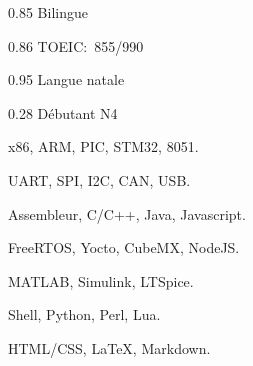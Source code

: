 \documentclass{faresume}
\begin{document}
\begin{column}[\rightcolumnwidth]




        {}{}{}{}

        {}{}{}{}

        {}{}{}{}

        {}{}{}{}


            {0.85}
            {Bilingue}
            {}{}{}

            {0.86}
            {TOEIC:~855/990}
            {}{}{}

            {0.95}
            {Langue natale}
            {}{}{}

            {0.28}
            {Débutant N4}
            {}{}{}


            {x86, ARM, PIC, STM32, 8051.}
            {}{}{}{}

            {UART, SPI, I2C, CAN, USB.}
            {}{}{}{}

            {Assembleur, C/C++, Java, Javascript.}
            {}{}{}{}

            {FreeRTOS, Yocto, CubeMX, NodeJS.}
            {}{}{}{}

            {MATLAB, Simulink, LTSpice.}
            {}{}{}{}

            {Shell, Python, Perl, Lua.}
            {}{}{}{}

            {HTML/CSS, {\LaTeX}, Markdown.}
            {}{}{}{}


\end{column}
\end{document}
